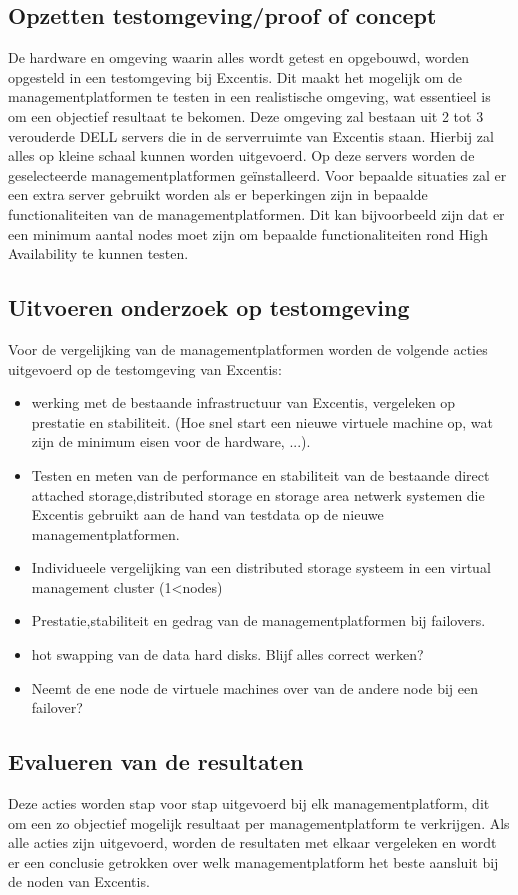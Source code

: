 \subsection{Opzetten testomgeving/proof of concept}
De hardware en omgeving waarin alles wordt getest en opgebouwd, worden opgesteld in een testomgeving bij Excentis. Dit maakt het mogelijk om de managementplatformen te testen in een realistische omgeving, wat essentieel is om een objectief resultaat te bekomen.
Deze omgeving zal bestaan uit 2 tot 3 verouderde DELL servers die in de serverruimte van Excentis staan. Hierbij zal alles op kleine schaal kunnen worden uitgevoerd.
Op deze servers worden de geselecteerde managementplatformen geïnstalleerd.
Voor bepaalde situaties zal er een extra server gebruikt worden als er beperkingen zijn in bepaalde functionaliteiten van de managementplatformen. Dit kan bijvoorbeeld zijn dat er een minimum aantal nodes moet zijn om bepaalde functionaliteiten rond High Availability te kunnen testen.
\subsection{Uitvoeren onderzoek op testomgeving}
Voor de vergelijking van de managementplatformen worden de volgende acties uitgevoerd op de testomgeving van Excentis:
\begin{itemize}
\item werking met de bestaande infrastructuur van Excentis, vergeleken op prestatie en stabiliteit. (Hoe snel start een nieuwe virtuele machine op, wat zijn de minimum eisen voor de hardware, ...).
\item Testen en meten van de performance en stabiliteit van de bestaande direct attached storage,distributed storage en storage area netwerk systemen die Excentis gebruikt aan de hand van testdata op de nieuwe managementplatformen.
\item Individueele vergelijking van een distributed storage systeem in een virtual management cluster (1<nodes)
\item Prestatie,stabiliteit en gedrag van de managementplatformen bij failovers.
\item hot swapping van de data hard disks. Blijf alles correct werken? 
\item Neemt de ene node de virtuele machines over van de andere node bij een failover?
\end{itemize}

\subsection{Evalueren van de resultaten}
Deze acties worden stap voor stap uitgevoerd bij elk managementplatform, dit om een zo objectief mogelijk resultaat per managementplatform te verkrijgen.
Als alle acties zijn uitgevoerd, worden de resultaten met elkaar vergeleken en wordt er een conclusie getrokken over welk managementplatform het beste aansluit bij de noden van Excentis.